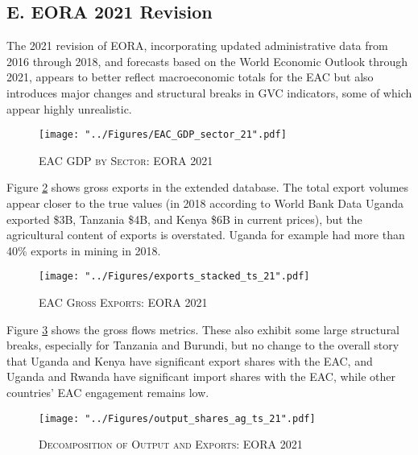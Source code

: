 \documentclass[a4paper]{article}
\begin{document}
\subsection*{E. EORA 2021 Revision}
\setcounter{table}{0}
\renewcommand{\thetable}{E\arabic{table}}
\setcounter{figure}{0}
\renewcommand{\thefigure}{E\arabic{figure}}

The 2021 revision of EORA, incorporating updated administrative data from 2016 through 2018, and forecasts based on the World Economic Outlook through 2021, appears to better reflect macroeconomic totals for the EAC but also introduces major changes and structural breaks in GVC indicators, some of which appear highly unrealistic. 

\begin{figure}[h!]
\centering
\caption{\label{fig:EAC_GDP_sec_21}\textsc{EAC GDP by Sector: EORA 2021}}
\texttt{[image: "../Figures/EAC\_GDP\_sector\_21".pdf]} %
\end{figure}
\FloatBarrier

Figure \ref{fig:exp21} shows gross exports in the extended database. The total export volumes appear closer to the true values (in 2018 according to World Bank Data Uganda exported \$3B, Tanzania \$4B, and Kenya \$6B in current prices), but the agricultural content of exports is overstated. Uganda for example had more than 40\% exports in mining in 2018. 

\begin{figure}[h!]
\centering
\caption{\label{fig:exp21}\textsc{EAC Gross Exports: EORA 2021}}
\texttt{[image: "../Figures/exports\_stacked\_ts\_21".pdf]} %
\end{figure}
\FloatBarrier

Figure \ref{fig:outshares_ag_ts_21} shows the gross flows metrics. These also exhibit some large structural breaks, especially for Tanzania and Burundi, but no change to the overall story that Uganda and Kenya have significant export shares with the EAC, and Uganda and Rwanda have significant import shares with the EAC, while other countries' EAC engagement remains low. 

\begin{figure}[h!] %
\centering
\caption{\label{fig:outshares_ag_ts_21}\textsc{Decomposition of Output and Exports: EORA 2021}}
\texttt{[image: "../Figures/output\_shares\_ag\_ts\_21".pdf]} %
\vspace{-15mm}
\end{figure}
\FloatBarrier
\end{document}
